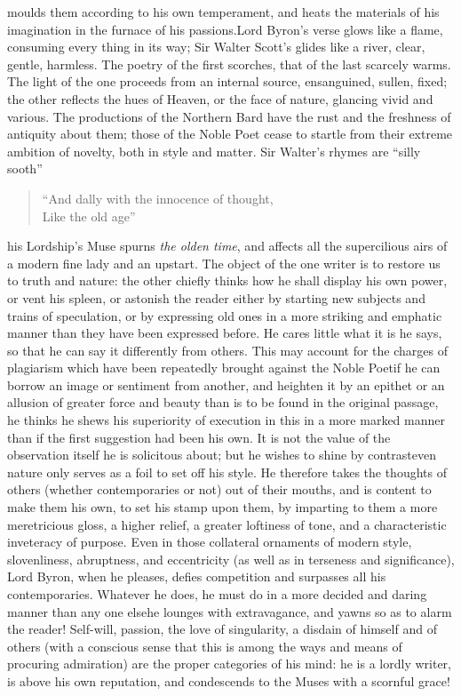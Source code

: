 moulds them according to his own temperament, and heats the materials
of his imagination in the furnace of his passions.\textemdash Lord Byron's verse
glows like a flame, consuming every thing in its way; Sir Walter Scott's
glides like a river, clear, gentle, harmless. The poetry of the first
scorches, that of the last scarcely warms. The light of the one proceeds
from an internal source, ensanguined, sullen, fixed; the other reflects
the hues of Heaven, or the face of nature, glancing vivid and various.
The productions of the Northern Bard have the rust and the freshness
of antiquity about them; those of the Noble Poet cease to startle
from their extreme ambition of novelty, both in style and matter. Sir
Walter's rhymes are ``silly sooth''\textemdash 
\begin{quote}
  ``And dally with the innocence of thought, \\
  Like the old age''\textemdash

\end{quote}
his Lordship's Muse spurns \emph{the olden time}, and affects all the
supercilious airs of a modern fine lady and an upstart. The object of
the one writer is to restore us to truth and nature: the other chiefly
thinks how he shall display his own power, or vent his spleen, or
astonish the reader either by starting new subjects and trains of
speculation, or by expressing old ones in a more striking and emphatic
manner than they have been expressed before. He cares little what it is
he says, so that he can say it differently from others. This may account
for the charges of plagiarism which have been repeatedly brought against
the Noble Poet\textemdash if he can borrow an image or sentiment from another, and
heighten it by an epithet or an allusion of greater force and beauty
than is to be found in the original passage, he thinks he shews his
superiority of execution in this in a more marked manner than if
the first suggestion had been his own. It is not the value of the
observation itself he is solicitous about; but he wishes to shine by
contrast\textemdash even nature only serves as a foil to set off his style. He
therefore takes the thoughts of others (whether contemporaries or not)
out of their mouths, and is content to make them his own, to set his
stamp upon them, by imparting to them a more meretricious gloss, a
higher relief, a greater loftiness of tone, and a characteristic
inveteracy of purpose. Even in those collateral ornaments of modern
style, slovenliness, abruptness, and eccentricity (as well as in
terseness and significance), Lord Byron, when he pleases, defies
competition and surpasses all his contemporaries. Whatever he does, he
must do in a more decided and daring manner than any one else\textemdash he lounges
with extravagance, and yawns so as to alarm the reader! Self-will,
passion, the love of singularity, a disdain of himself and of others
(with a conscious sense that this is among the ways and means of
procuring admiration) are the proper categories of his mind: he is a
lordly writer, is above his own reputation, and condescends to the Muses
with a scornful grace!

